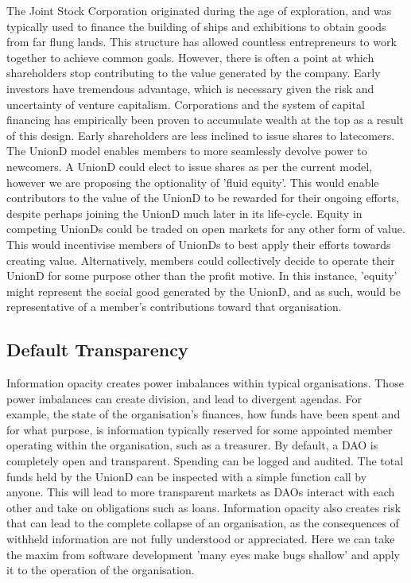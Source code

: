 \documentclass[12pt,twocolumn]{article}
\begin{document}
The Joint Stock Corporation originated during the age of exploration, and was typically used to finance the building of ships and exhibitions to obtain goods from far flung lands. This structure has allowed countless entrepreneurs to work together to achieve common goals. However, there is often a point at which shareholders stop contributing to the value generated by the company. Early investors have tremendous advantage, which is necessary given the risk and uncertainty of venture capitalism. Corporations and the system of capital financing has empirically been proven to accumulate wealth at the top as a result of this design. Early shareholders are less inclined to issue shares to latecomers. The UnionD model enables members to more seamlessly devolve power to newcomers. A UnionD could elect to issue shares as per the current model, however we are proposing the optionality of 'fluid equity'. This would enable contributors to the value of the UnionD to be rewarded for their ongoing efforts, despite perhaps joining the UnionD much later in its life-cycle. Equity in competing UnionDs could be traded on open markets for any other form of value. This would incentivise members of UnionDs to best apply their efforts towards creating value. Alternatively, members could collectively decide to operate their UnionD for some purpose other than the profit motive. In this instance, 'equity' might represent the social good generated by the UnionD, and as such, would be representative of a member's contributions toward that organisation. 

\subsection {Default Transparency}

Information opacity creates power imbalances within typical organisations. Those power imbalances can create division, and lead to divergent agendas. For example, the state of the organisation's finances, how funds have been spent and for what purpose, is information typically reserved for some appointed member operating within the organisation, such as a treasurer. By default, a DAO is completely open and transparent. Spending can be logged and audited. The total funds held by the UnionD can be inspected with a simple function call by anyone. This will lead to more transparent markets as DAOs interact with each other and take on obligations such as loans. Information opacity also creates risk that can lead to the complete collapse of an organisation, as the consequences of withheld information are not fully understood or appreciated. Here we can take the maxim from software development 'many eyes make bugs shallow' and apply it to the operation of the organisation.
\end{document}
